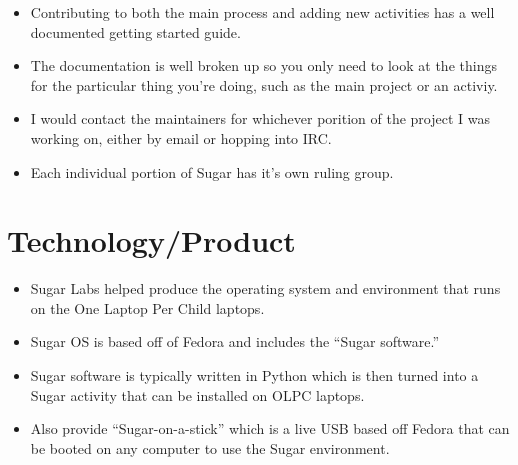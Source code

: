\begin{itemize}
\itemsep1pt\parskip0pt
\item
  Contributing to both the main process and adding new activities has a
  well documented getting started guide.
\item
  The documentation is well broken up so you only need to look at the
  things for the particular thing you're doing, such as the main project
  or an activiy.
\item
  I would contact the maintainers for whichever porition of the project
  I was working on, either by email or hopping into IRC.
\item
  Each individual portion of Sugar has it's own ruling group.
\end{itemize}

\section{Technology/Product}\label{technologyproduct}

\begin{itemize}
\itemsep1pt\parskip0pt
\item
  Sugar Labs helped produce the operating system and environment that
  runs on the One Laptop Per Child laptops.
\item
  Sugar OS is based off of Fedora and includes the ``Sugar software.''
\item
  Sugar software is typically written in Python which is then turned
  into a Sugar activity that can be installed on OLPC laptops.
\item
  Also provide ``Sugar-on-a-stick'' which is a live USB based off Fedora
  that can be booted on any computer to use the Sugar environment.
\end{itemize}
